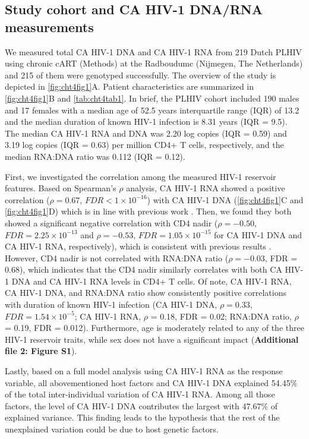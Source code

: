 \documentclass{book}
\begin{document}
\begin{refsection}
\subsection*{Study cohort and CA HIV-1 DNA/RNA measurements}
We measured total CA HIV-1 DNA and CA HIV-1 RNA from 219 Dutch PLHIV using chronic cART (Methods) at the Radboudumc (Nijmegen, The Netherlands) \cite{van2021Chronic} and 215 of them were genotyped successfully.
The overview of the study is depicted in \ref{fig:cht4fig1}A.
Patient characteristics are summarized in \ref{fig:cht4fig1}B and \ref{tab:cht4tab1}.
In brief, the PLHIV cohort included 190 males and 17 females with a median age of 52.5 years interquartile range (IQR) of 13.2 and the median duration of known HIV-1 infection is 8.31 years (IQR = 9.5).
The median CA HIV-1 RNA and DNA was 2.20 log copies (IQR = 0.59) and 3.19 log copies (IQR = 0.63) per million CD4+ T cells, respectively, and the median RNA:DNA ratio was 0.112 (IQR = 0.12).

First, we investigated the correlation among the measured HIV-1 reservoir features.
Based on Spearman's $\rho$ analysis, CA HIV-1 RNA showed a positive correlation ($\rho = 0.67$, $FDR < 1 \times 10^{-16}$) with CA HIV-1 DNA (\ref{fig:cht4fig1}C and \ref{fig:cht4fig1}D) which is in line with previous work \cite{Pasternak2018What}.
Then, we found they both showed a significant negative correlation with CD4 nadir ($\rho = -0.50$, $FDR = 2.25 \times 10^{-13}$ and $\rho = -0.53$, $FDR = 1.05 \times 10^{-15}$ for CA HIV-1 DNA and CA HIV-1 RNA, respectively), which is consistent with previous results \cite{Chun2002Relationship,Alidjinou2017The}.
However, CD4 nadir is not correlated with RNA:DNA ratio ($\rho = - 0.03$, FDR = 0.68), which indicates that the CD4 nadir similarly correlates with both CA HIV-1 DNA and CA HIV-1 RNA levels in CD4+ T cells.
Of note, CA HIV-1 RNA, CA HIV-1 DNA, and RNA:DNA ratio show consistently positive correlations with duration of known HIV-1 infection (CA HIV-1 DNA, $\rho = 0.33$, $FDR = 1.54 \times 10^{-5}$; CA HIV-1 RNA, $\rho$ = 0.18, FDR = 0.02; RNA:DNA ratio, $\rho$ = 0.19, FDR = 0.012).
Furthermore, age is moderately related to any of the three HIV-1 reservoir traits, while sex does not have a significant impact (\textbf{Additional file 2: Figure S1}).

Lastly, based on a full model analysis using CA HIV-1 RNA as the response variable, all abovementioned host factors and CA HIV-1 DNA explained 54.45\% of the total inter-individual variation of CA HIV-1 RNA.
Among all those factors, the level of CA HIV-1 DNA contributes the largest with 47.67\% of explained variance.
This finding leads to the hypothesis that the rest of the unexplained variation could be due to host genetic factors.


\end{refsection}
\end{document}
